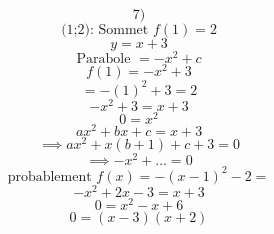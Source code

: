 \documentclass{article}
\begin{document}
\[ \text{7)} \]
\[ \text{(1;2):  Sommet } f(1)=2 \]
\[ y = x+3 \]
\[ \text{Parabole } = -x^2+c \]
\[ f(1) = -x^2+3 \]
\[ = -(1)^2+3 = 2 \]
\[ -x^2+3 = x+3 \]
\[ 0 = x^2 \]
\[ ax^2+bx+c = x+3 \]
\[ \implies ax^2+x(b+1)+c+3 = 0 \]
\[ \implies -x^2+... = 0 \]
\[ \text{probablement } f(x) = -(x-1)^2-2 = \]
\[ -x^2+2x-3 = x+3 \]
\[ 0 = x^2-x+6 \]
\[ 0 = (x-3)(x+2) \]
\end{document}
